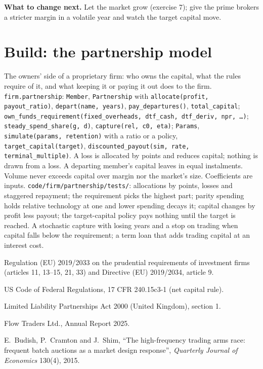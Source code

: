 \textbf{What to change next.} Let the market grow (exercise 7); give the prime brokers a stricter margin in a volatile year and watch the
target capital move.

\section{Build: the partnership model}\label{bld:fm:the-proprietary-market-making-firm:partnership}

\begin{build}
 The owners' side of a proprietary firm: who owns the capital, what the rules require of it, and what keeping it or paying it
out does to the firm.
 \texttt{firm.partnership}: \texttt{Member}, \texttt{Partnership} with \texttt{allocate(profit, payout\_ratio)},
\texttt{depart(name, years)}, \texttt{pay\_departures()}, \texttt{total\_capital}; \texttt{own\_funds\_requirement(fixed\_overheads, dtf\_cash,
dtf\_deriv, npr, \dots)}; \texttt{steady\_spend\_share(g, d)}, \texttt{capture(rel, c0, eta)}; \texttt{Params}, \texttt{simulate(params,
retention)} with a ratio or a policy, \texttt{target\_capital(target)}, \texttt{discounted\_payout(sim, rate, terminal\_multiple)}.
 A loss is allocated by points and reduces capital; nothing is drawn from a loss. A departing member's capital leaves in equal
instalments. Volume never exceeds capital over margin nor the market's size. Coefficients are inputs.
 \texttt{code/firm/partnership/tests/}: allocations by points, losses and staggered repayment; the requirement picks the
highest part; parity spending holds relative technology at one and lower spending decays it; capital changes by profit less payout; the
target-capital policy pays nothing until the target is reached.
 A stochastic capture with losing years and a stop on trading when capital falls below the requirement; a term loan that adds
trading capital at an interest cost.
\end{build}

\begin{omsources}
\item Regulation (EU) 2019/2033 on the prudential requirements of investment firms (articles 11, 13--15, 21, 33) and Directive (EU) 2019/2034,
article 9.
\item US Code of Federal Regulations, 17 CFR 240.15c3-1 (net capital rule).
\item Limited Liability Partnerships Act 2000 (United Kingdom), section 1.
\item Flow Traders Ltd., Annual Report 2025.
\item E.~Budish, P.~Cramton and J.~Shim, ``The high-frequency trading arms race: frequent batch auctions as a market design response'',
\emph{Quarterly Journal of Economics} 130(4), 2015.
\end{omsources}

